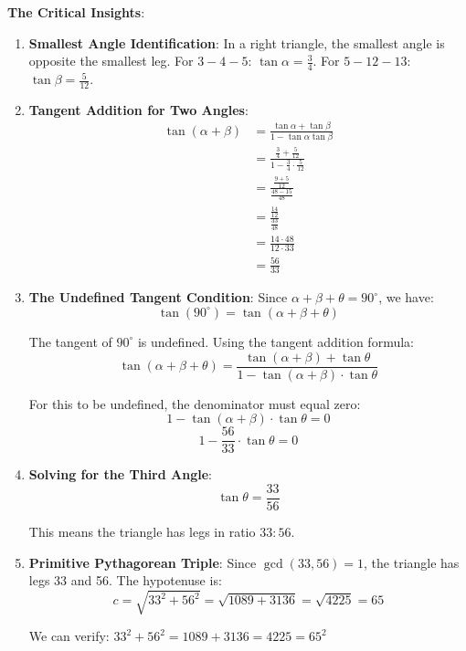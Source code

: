 \documentclass[12pt]{article}
\begin{document}
\begin{keyinsightbox}
\textbf{The Critical Insights}:

\begin{enumerate}
    \item \textbf{Smallest Angle Identification}: In a right triangle, the smallest angle is opposite the smallest leg. For $3-4-5$: $\tan\alpha = \frac{3}{4}$. For $5-12-13$: $\tan\beta = \frac{5}{12}$.
    
    \item \textbf{Tangent Addition for Two Angles}:
    \begin{align*}
        \tan(\alpha + \beta) &= \frac{\tan\alpha + \tan\beta}{1 - \tan\alpha \tan\beta} \\
        &= \frac{\frac{3}{4} + \frac{5}{12}}{1 - \frac{3}{4} \cdot \frac{5}{12}} \\
        &= \frac{\frac{9 + 5}{12}}{\frac{48 - 15}{48}} \\
        &= \frac{\frac{14}{12}}{\frac{33}{48}} \\
        &= \frac{14 \cdot 48}{12 \cdot 33} \\
        &= \frac{56}{33}
    \end{align*}
    
    \item \textbf{The Undefined Tangent Condition}: Since $\alpha + \beta + \theta = 90^{\circ}$, we have:
    $$\tan(90^{\circ}) = \tan(\alpha + \beta + \theta)$$
    
    The tangent of $90^{\circ}$ is undefined. Using the tangent addition formula:
    $$\tan(\alpha + \beta + \theta) = \frac{\tan(\alpha + \beta) + \tan\theta}{1 - \tan(\alpha + \beta) \cdot \tan\theta}$$
    
    For this to be undefined, the denominator must equal zero:
    $$1 - \tan(\alpha + \beta) \cdot \tan\theta = 0$$
    $$1 - \frac{56}{33} \cdot \tan\theta = 0$$
    
    \item \textbf{Solving for the Third Angle}:
    $$\tan\theta = \frac{33}{56}$$
    
    This means the triangle has legs in ratio $33:56$.
    
    \item \textbf{Primitive Pythagorean Triple}: Since $\gcd(33, 56) = 1$, the triangle has legs 33 and 56. The hypotenuse is:
    $$c = \sqrt{33^2 + 56^2} = \sqrt{1089 + 3136} = \sqrt{4225} = 65$$
    
    We can verify: $33^2 + 56^2 = 1089 + 3136 = 4225 = 65^2$ \checkmark
    

\end{enumerate}
\end{keyinsightbox}
\end{document}
